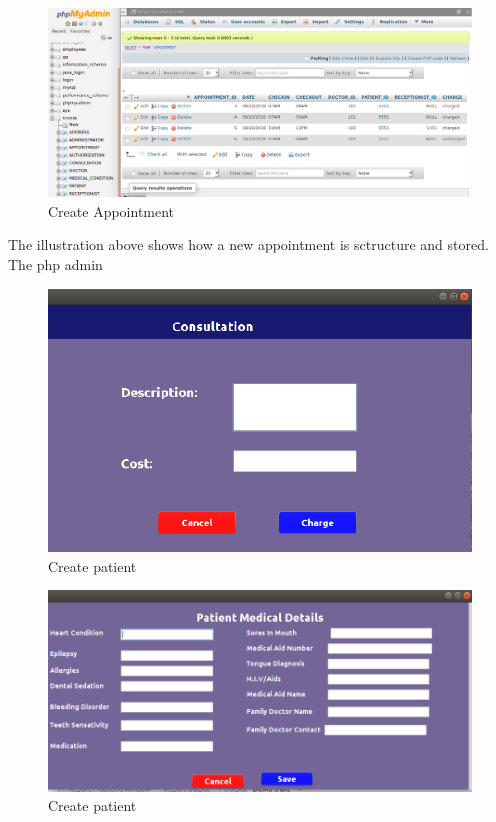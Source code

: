 \documentclass[11 pt]{article}
\begin{document}
\begin{figure}[h]
    \centering 
    \includegraphics[width=\linewidth]{appointment_table_php.png}
    \caption{Create Appointment}
    \label{fig:Appointment}
    \end{figure}
The illustration above shows how a new appointment is sctructure and stored. The php admin 
 \begin{figure}[h]
    \centering 
    \includegraphics[width=\linewidth]{consultation.png}
    \caption{Create patient}
    \label{fig:Appointment}
    \end{figure}
    
 \begin{figure}[h]
    \centering 
    \includegraphics[width=1.2\linewidth]{patientmedicalcond.png}
    \caption{Create patient}
    \label{fig:Appointment}
    \end{figure}
\clearpage
\end{document}
